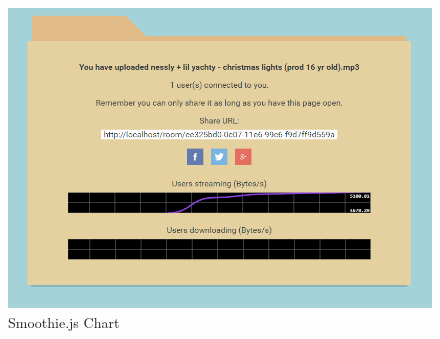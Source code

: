 \documentclass[]{report}
\begin{document}
	\chapter{}
	\begin{figure}[H]
		\caption{Smoothie.js Chart}
		\centering
		\includegraphics[scale=0.5]{smoothie-js.png}
	\end{figure}
\end{document}

